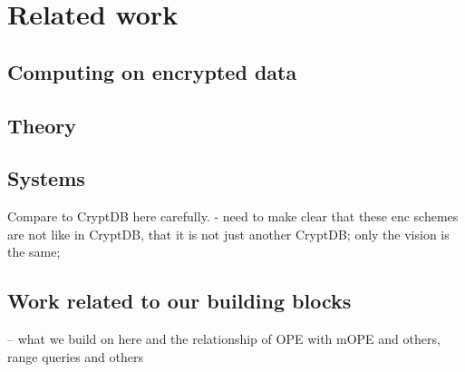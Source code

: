 
\section{Related work}\label{sec:related}



\subsection{Computing on encrypted data}

\subsection{Theory}


\subsection{Systems}

Compare to CryptDB here carefully. 
- need to make clear that these enc schemes are not like in CryptDB, that it is not just another CryptDB; only the vision is the same; %


\subsection{Work related to our building blocks}

-- what we build on here and the relationship of OPE with mOPE and others, range queries and others

